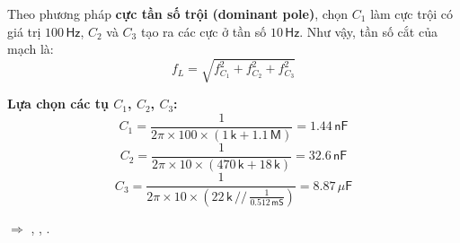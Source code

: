 Theo phương pháp \textbf{cực tần số trội (dominant pole)}, chọn $C_{1}$ làm cực trội có giá trị $100\,\textsf{Hz}$, 
$C_{2}$ và $C_{3}$ tạo ra các cực ở tần số $10\,\textsf{Hz}$.  
Như vậy, tần số cắt của mạch là:
\[
f_{L}=\sqrt{f_{C_{1}}^{2}+f_{C_{2}}^{2}+f_{C_{3}}^{2}}
\]

\textbf{Lựa chọn các tụ $C_{1}$, $C_{2}$, $C_{3}$:}
\[
C_{1}=\frac{1}{2\pi\times100\times\left(1\,\textsf{k}+1.1\,\textsf{M}\right)}=1.44\,\textsf{nF}
\]
\[
C_{2}=\frac{1}{2\pi\times10\times(470\,\textsf{k}+18\,\textsf{k})}=32.6\,\textsf{nF}
\]
\[
C_{3}=\frac{1}{2\pi\times10\times\left(22\,\textsf{k}\,//\,\frac{1}{0.512\,\textsf{mS}}\right)}=8.87\,\mu\textsf{F}
\]

$\Rightarrow$ , , .
